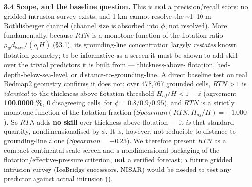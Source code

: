 \documentclass[11pt]{article}
\begin{document}
\textbf{3.4 Scope, and the baseline question.} This is \textbf{not} a precision/recall score: no gridded intrusion survey exists, and 1 km cannot resolve the \textasciitilde{}1–10 m Röthlisberger channel (channel size is absorbed into $\phi $, not resolved). More fundamentally, because $RTN$ is a monotone function of the flotation ratio $\rho _{w} d_{base}/(\rho _{i} H)$ (§3.1), its grounding-line concentration largely \emph{restates} known flotation geometry; to be informative as a screen it must be shown to add skill over the trivial predictors it is built from — thickness-above- flotation, bed-depth-below-sea-level, or distance-to-grounding-line. A direct baseline test on real Bedmap2 geometry confirms it does not: over 478,767 grounded cells, ${RTN>1}$ is \emph{identical} to the thickness-above-flotation threshold ${H_{af}/H<1-\phi }$ (agreement \textbf{100.0000 \%}, 0 disagreeing cells, for $\phi =0.8/0.9/0.95$), and $RTN$ is a strictly monotone function of the flotation fraction ($Spearman(RTN, H_{af}/H)=-1.000$). So $RTN$ adds \textbf{no skill} over thickness-above-flotation — it \emph{is} that standard quantity, nondimensionalised by $\phi $. It is, however, not reducible to distance-to-grounding-line alone ($Spearman=-0.23$). We therefore present $RTN$ as a compact continental-scale screen and a nondimensional packaging of the flotation/effective-pressure criterion, \textbf{not} a verified forecast; a future gridded intrusion survey (IceBridge successors, NISAR) would be needed to test any predictor against actual intrusion ().
\end{document}
